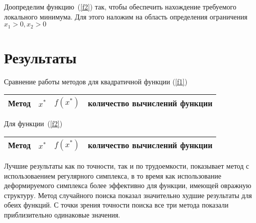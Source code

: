 \documentclass[12pt,a4paper,oneside]{report}
\begin{document}
Доопределим функцию~(\ref{f2}) так, чтобы обеспечить нахождение требуемого локального минимума. Для этого наложим на область определения ограничения $x_{1}>0, x_{2}>0$
\section*{Результаты}
 Сравнение работы методов для квадратичной функции (\ref{f1})
\begin{center}
\begin{tabular}{||c|c|c|c||}
\hline
Метод		&	$x^{*}$	&	$f(x^{*})$  &	количество вычислений функции \\
\hline
 
\hline
 
\hline
 
\hline
 
\hline 		
\end{tabular}
\end{center}

Для функции~(\ref{f2})
\begin{center}
\begin{tabular}{||c|c|c|c||}
\hline
Метод		&	$x^{*}$	&	$f(x^{*})$  &	количество вычислений функции \\
\hline
 
\hline
 
\hline
 
\hline
 
\hline 		
\end{tabular}
\end{center} 

Лучшие результаты как по точности, так и по трудоемкости, показывает метод с использоваением регулярного симплекса, в то время как использование деформируемого симплекса более эффективно для функции, имеющей овражную структуру. Метод случайного поиска показал значительно худшие результаты для обеих функций. С точки зрения точности поиска все три метода показали приблизительно одинаковые значения.
\end{document}
